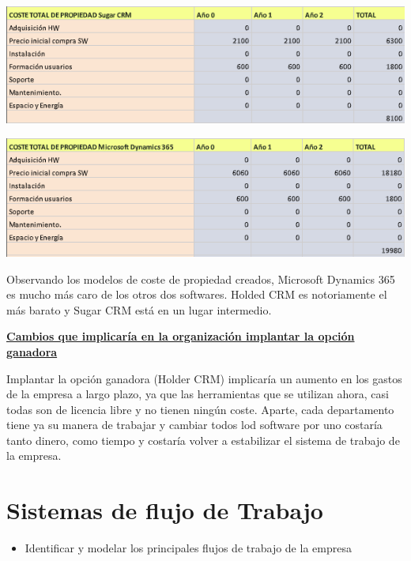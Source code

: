 \documentclass{article}
\begin{document}
\begin{center}
\includegraphics[scale=0.5]{images/sugar.png}
\end{center}

\begin{center}
\includegraphics[scale=0.5]{images/Microsoft.png}
\end{center}

Observando los modelos de coste de propiedad creados, Microsoft Dynamics 365 es mucho más caro de los otros dos softwares. Holded CRM es notoriamente el más barato y Sugar CRM está en un lugar intermedio.

\vspace{5mm}

\textbf{\underline{Cambios que implicaría en la organización implantar la opción ganadora}}

\vspace{5mm}

Implantar la opción ganadora (Holder CRM)  implicaría un aumento en los gastos de la empresa a largo plazo, ya que las herramientas que se utilizan ahora, casi todas son de licencia libre y no tienen ningún coste. Aparte, cada departamento tiene ya su manera de trabajar y cambiar todos lod software por uno costaría tanto dinero, como tiempo y costaría volver a estabilizar el sistema de trabajo de la empresa.

\section{Sistemas de flujo de Trabajo}

\begin{itemize}
\item Identificar y modelar los principales flujos de trabajo de la empresa
\end{itemize}
\end{document}
